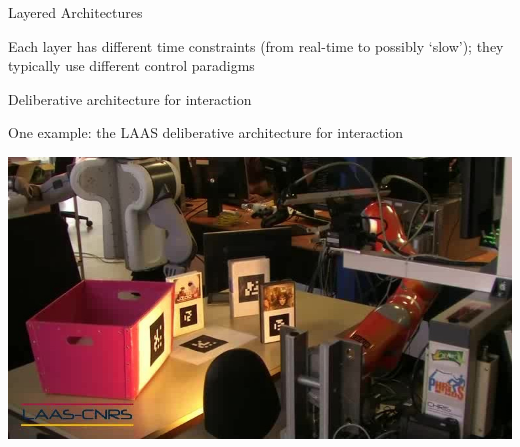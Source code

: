 \documentclass[compress]{beamer}
\begin{document}
\begin{frame}{Layered Architectures}
    \begin{center}
    \end{center}

    Each layer has different time constraints (from real-time to possibly `slow'); they typically use different control paradigms
\end{frame}


\begin{frame}{Deliberative architecture for interaction}

    One example: the LAAS deliberative architecture for interaction

    \begin{center}
        \includegraphics[width=0.8\linewidth]{clean-table}
    \end{center}
\end{frame}

\end{document}
